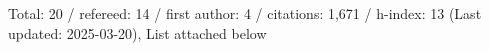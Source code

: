 Total: 20 / refereed: 14 / first author: 4 / citations: 1,671 / h-index: 13 (Last updated: 2025-03-20), List attached below